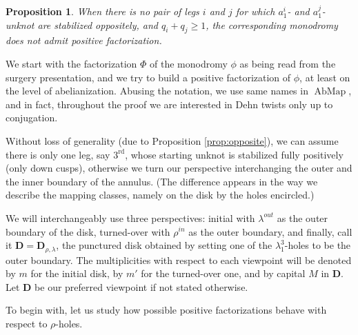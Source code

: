 \documentclass{amsart}
\newtheorem{prop}[thm]{Proposition}
\theoremstyle{definition}
\begin{document}
\begin{prop}\label{prop:no+factor}
When there is no pair of legs $i$ and $j$ for which $a_1^i$- and $a_1^j$-unknot are stabilized oppositely, and $q_i+q_j\geq 1$, the corresponding monodromy does not admit positive factorization. 
\end{prop}

\proof
We start with the factorization $\Phi$ of the monodromy $\phi$ as being read from the surgery presentation, and we try to build a positive factorization of $\phi$, at least on the level of abelianization. Abusing the notation, we use same names in $\operatorname{AbMap}$, and in fact, throughout the proof we are interested in Dehn twists only up to conjugation.

Without loss of generality (due to Proposition \ref{prop:opposite}), we can assume there is only one leg, say $3^\text{rd}$, whose starting unknot is stabilized fully positively (only down cusps), otherwise we turn our perspective interchanging the outer and the inner boundary of the annulus. (The difference appears in the way we describe the mapping classes, namely on the disk by the holes encircled.) 

We will interchangeably use three perspectives: initial with $\lambda^{out}$ as the outer boundary of the disk, turned-over with $\rho^{in}$ as the outer boundary, and finally, call it $\mathbf D=\mathbf D_{\rho,\lambda}$, the punctured disk obtained by setting one of the $\lambda_1^3$-holes to be the outer boundary. The multiplicities with respect to each viewpoint will be denoted by $m$ for the initial disk, by $m'$ for the turned-over one, and by capital $M$ in $\mathbf D$. Let $\mathbf D$ be our preferred viewpoint if not stated otherwise.

To begin with, let us study how possible positive factorizations behave with respect to $\rho$-holes.
\end{document}
